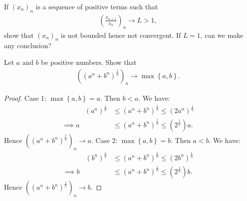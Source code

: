 \documentclass[10pt,twoside,openany]{memoir}
\begin{document}
    \begin{exercise}
        If $(x_n)_n$ is a sequence of positive terms such that
            \begin{equation*}
            \begin{split}
                \left(\frac{x_{n+1}}{x_n}\right)_n \rightarrow L > 1,
            \end{split}
            \end{equation*}
        show that $(x_n)_n$ is not bounded hence not convergent. If $L=1$, can we make any conclusion?
    \end{exercise}
    \begin{exercise}
        Let $a$ and $b$ be positive numbers. Show that
            \begin{equation*}
            \begin{split}
                \left((a^n+b^n)^\frac{1}{n}\right)_n \rightarrow \max \left\{a,b\right\}.
            \end{split}
            \end{equation*}
    \end{exercise}
        {\color{red} \begin{proof}
            Case 1: $\max \left\{a,b\right\} = a$. Then $b < a$. We have:
                \begin{equation*}
                \begin{split}
                    \phantom{implies}(a^n)^\frac{1}{n} &\leq (a^n+b^n)^\frac{1}{n} \leq (2a^n)^\frac{1}{n} \\
                    \implies a &\leq (a^n+b^n)^\frac{1}{n} \leq (2^\frac{1}{n})a.
                \end{split}
                \end{equation*}
            Hence $\left((a^n + b^n)^\frac{1}{n}\right)_n \rightarrow a$. Case 2: $\max \left\{a,b\right\} = b$. Then $a < b$. We have:
                \begin{equation*}
                \begin{split}
                    \phantom{implies}(b^n)^\frac{1}{n} &\leq (a^n+b^n)^\frac{1}{n} \leq (2b^n)^\frac{1}{n} \\
                    \implies b &\leq (a^n+b^n)^\frac{1}{n} \leq (2^\frac{1}{n})b.
                \end{split}
                \end{equation*}
            Hence $\left((a^n + b^n)^\frac{1}{n}\right)_n \rightarrow b$.
        \end{proof}}
\end{document}
